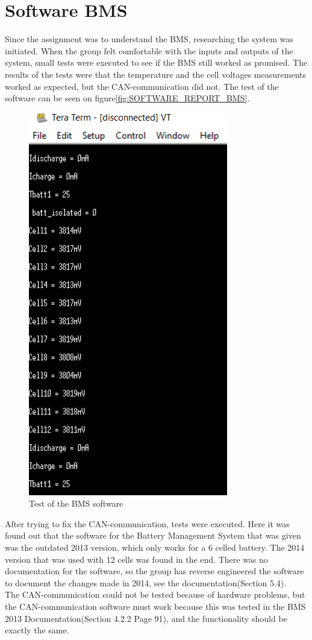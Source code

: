 \section{Software BMS}
Since the assignment was to understand the BMS, researching the system was initiated. When the group felt comfortable with the inputs and outputs of the system, small tests were executed to see if the BMS still worked as promised. The results of the tests were that the temperature and the cell voltages measurements worked as expected, but the CAN-communication did not. The test of the software can be seen on figure\vref{fig:SOFTWARE_REPORT_BMS}.\\

\begin{figure}[H]
	\centering
	\includegraphics[width=0.4\linewidth]{SubPages/Images/BMS_teraterm_test.PNG}
	\caption{Test of the BMS software}
	\label{fig:SOFTWARE_REPORT_BMS}
\end{figure}

After trying to fix the CAN-communication, tests were executed. Here it was found out that the software for the Battery Management System that was given was the outdated 2013 version, which only works for a 6 celled battery. The 2014 version that was used with 12 cells was found in the end. There was no documentation for the software, so the group has reverse engineered the software to document the changes made in 2014, see the documentation\cite{AU2}(Section 5.4).\\
The CAN-communication could not be tested because of hardware problems, but the CAN-communication software must work because this was tested in the BMS 2013 Documentation\cite{BMSDocumentation}(Section 4.2.2 Page 91), and the functionality should be exactly the same.

